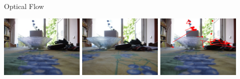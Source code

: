 \documentclass{beamer}
\begin{document}
\begin{frame}
\begin{block}{Optical Flow}
\begin{center}
\includegraphics[width=0.3\textwidth]{images/frame0.jpg}
\includegraphics[width=0.3\textwidth]{images/frame1.jpg}
\includegraphics[width=0.3\textwidth]{images/optical_flow.png}
\end{center}
\end{block}
\end{frame}
\end{document}
